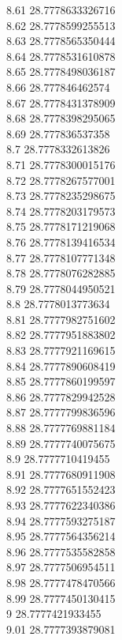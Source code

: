 {8.61	28.7778633326716\\
8.62	28.7778599255513\\
8.63	28.7778565350444\\
8.64	28.7778531610878\\
8.65	28.7778498036187\\
8.66	28.777846462574\\
8.67	28.7778431378909\\
8.68	28.7778398295065\\
8.69	28.777836537358\\
8.7	28.7778332613826\\
8.71	28.7778300015176\\
8.72	28.7778267577001\\
8.73	28.7778235298675\\
8.74	28.7778203179573\\
8.75	28.7778171219068\\
8.76	28.7778139416534\\
8.77	28.7778107771348\\
8.78	28.7778076282885\\
8.79	28.7778044950521\\
8.8	28.7778013773634\\
8.81	28.7777982751602\\
8.82	28.7777951883802\\
8.83	28.7777921169615\\
8.84	28.7777890608419\\
8.85	28.7777860199597\\
8.86	28.7777829942528\\
8.87	28.7777799836596\\
8.88	28.7777769881184\\
8.89	28.7777740075675\\
8.9	28.7777710419455\\
8.91	28.7777680911908\\
8.92	28.7777651552423\\
8.93	28.7777622340386\\
8.94	28.7777593275187\\
8.95	28.7777564356214\\
8.96	28.7777535582858\\
8.97	28.7777506954511\\
8.98	28.7777478470566\\
8.99	28.7777450130415\\
9	28.7777421933455\\
9.01	28.7777393879081\\
}

